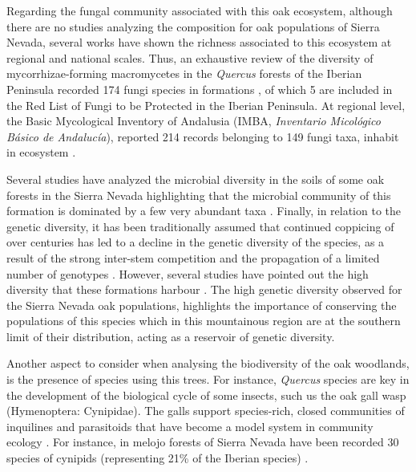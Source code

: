 Regarding the fungal community associated with this oak ecosystem, although there are no studies analyzing the composition for oak populations of Sierra Nevada, several works have shown the richness associated to this ecosystem at regional and national scales. Thus, an exhaustive review of the diversity of mycorrhizae-forming macromycetes in the \emph{Quercus} forests of the Iberian Peninsula recorded 174 fungi species in \Qp formations \autocites{Ortegaetal2010MycorrhizalMacrofungi}, of which 5 are included in the Red List of Fungi to be Protected in the Iberian Peninsula. At regional level, the Basic Mycological Inventory of Andalusia (IMBA, \emph{Inventario Micológico Básico de Andalucía}), reported 214 records belonging to 149 fungi taxa, inhabit in \Qp ecosystem \autocites{MorenoArroyo2004InventarioMicologico}. 

Several studies have analyzed the microbial diversity in the soils of some oak forests in the Sierra Nevada highlighting that the microbial community of this formation is dominated by a few very abundant taxa \autocites{CoboDiaz2017,Lasaetal2019BacteriaEndosphere, Lasaetal2019MetabarcodingReveals}. Finally, in relation to the genetic diversity, it has been traditionally assumed that continued coppicing of \Qp over centuries has led to a decline in the genetic diversity of the species, as a result of the strong inter-stem competition and the propagation of a limited number of genotypes 
\autocites{SanchezPalomaresetal2008EstacionesEcologicas,Bravoetal2008SelviculturaMontes}. However, several studies have pointed out the high diversity that these formations harbour \autocites{ValbuenaCarabanaGil2013GeneticResilience,ValbuenaCarabanaGil2013ReduceAprovechamiento,ValbuenaCarabanaGil2014EfectosGestion,ValbuenaCarabanaGil2017CentenaryCoppicing}. The high genetic diversity observed for the Sierra Nevada oak populations, highlights the importance of conserving the populations of this species which in this mountainous region are at the southern limit of their distribution, acting as a reservoir of genetic diversity. 

Another aspect to consider when analysing the biodiversity of the oak woodlands, is the presence of species using this trees. For instance, \emph{Quercus} species are key in the development of the biological cycle of some insects, such us the oak gall wasp (Hymenoptera: Cynipidae). The galls support species-rich, closed communities of inquilines and parasitoids that have become a model system in community ecology \autocites{Stoneetal2002PopulationBiology}. For instance, in melojo forests of Sierra Nevada have been recorded 30 species of cynipids (representing 21\% of the Iberian species) \autocites{NievesAldrey2013AvispasAgallas}. 

